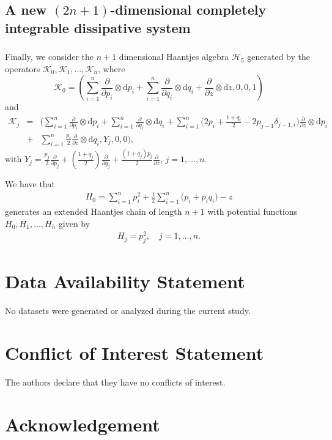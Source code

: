 \documentclass[10pt]{amsart}
\numberwithin{equation}{section}
\newcommand{\beq}{\begin{equation}}
\newcommand{\eeq}{\end{equation}}
\newcommand{\bea}{\begin{eqnarray}}
\newcommand{\eea}{\end{eqnarray}}
\newcommand{\nn}{\nonumber}
\newcommand{\rd}{\mathrm{d}}
\theoremstyle{definition}
\begin{document}
\subsection{A new $(2n+1)$-dimensional completely integrable dissipative system}
\subsubsection{} Finally, we consider the $n+1$ dimensional Haantjes algebra $\mathscr{H}_5$ generated by the operators $\mathcal{K}_0,\mathcal{K}_1, \ldots, \mathcal{K}_n$, where
\beq
\mathcal{K}_0= \left(\sum_{i=1}^{n}\frac{\partial}{\partial p_i}\otimes \rd p_i+\sum_{i=1}^{n}\frac{\partial}{\partial q_i}\otimes \rd q_i+\frac{\partial}{\partial z}\otimes \rd z,0,0,1\right)
\eeq
and
\bea \nn
\mathcal{K}_j &=&  \Bigg(\sum_{i=1}^{n}\frac{\partial}{\partial p_i}\otimes \rd p_i + \sum_{i=1}^{n} \frac{\partial}{\partial q_i}\otimes \rd q_i + \sum_{i=1}^{n} \Big(2 p_i + \frac{1+q_i}{2} - 2p_{j-1} \delta_{j-1,i}\Big)  \frac{\partial}{\partial z}\otimes \rd p_i \\  \nn &+& \sum_{i=1}^{n} \frac{p_i}{2} \frac{\partial}{\partial z }\otimes \rd q_i, Y_j,0,0 \Bigg),
\eea
with $Y_{j}=\frac{p_{j}}{2}\frac{\partial}{\partial p_{j}}+(\frac{1+q_{j}}{2})\frac{\partial}{\partial q_{j}}+\frac{(1+q_{j})p_{j}}{2}\frac{\partial}{\partial z}$, $j=1,\ldots, n$.
\vspace{2mm}

We have that
\bea
H_0= \sum_{i=1}^{n} p_i^2+ \frac{1}{2}\sum_{i=1}^{n}\big( p_i+ p_i q_i\big) -z
\eea
generates an extended Haantjes chain of length $n+1$ with potential functions $H_{0},H_{1},\ldots,H_{h}$ given by
\bea
H_j = p_j^2,\quad j=1,\ldots,n.
\eea





\section*{Data Availability Statement}  No datasets were generated or analyzed during the current study.



\section*{Conflict of Interest Statement} The authors declare that they have no conflicts of interest.



\section*{Acknowledgement}
\end{document}
